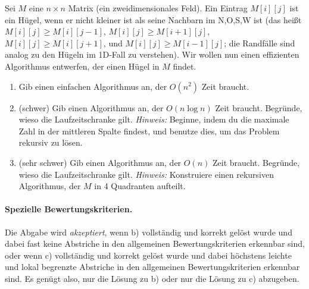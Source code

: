 \documentclass{uebung_cs}
\begin{document}
	Sei $M$ eine $n\times n$ Matrix (ein zweidimensionales Feld).
	Ein Eintrag $M[i][j]$ ist ein Hügel, wenn er nicht kleiner ist als seine Nachbarn im N,O,S,W ist (das heißt $M[i][j]\ge M[i][j-1]$, $M[i][j]\ge M[i+1][j]$, $M[i][j]\ge M[i][j+1]$, und $M[i][j]\ge M[i-1][j]$; die Randfälle sind analog zu den Hügeln im 1D-Fall zu verstehen).
	Wir wollen nun einen effizienten Algorithmus entwerfen, der einen Hügel in $M$ findet.
	\begin{enumerate}
		\item Gib einen einfachen Algorithmus an, der $O(n^2)$ Zeit braucht.
		\item (schwer) Gib einen Algorithmus an, der $O(n \log n)$ Zeit braucht. Begründe, wieso die Laufzeitschranke gilt. \emph{Hinweis:} Beginne, indem du die maximale Zahl in der mittleren Spalte findest, und benutze dies, um das Problem rekursiv zu lösen.
		\item (sehr schwer) Gib einen Algorithmus an, der $O(n)$ Zeit braucht. Begründe, wieso die Laufzeitschranke gilt. \emph{Hinweis:} Konstruiere einen rekursiven Algorithmus, der $M$ in 4 Quadranten aufteilt.
	\end{enumerate}

\paragraph{Spezielle Bewertungskriterien.}
Die Abgabe wird \emph{akzeptiert}, wenn b) vollständig und korrekt gelöst wurde und dabei fast keine Abstriche in den allgemeinen Bewertungskriterien erkennbar sind, oder wenn c) vollständig und korrekt gelöst wurde und dabei höchstens leichte und lokal begrenzte Abstriche in den allgemeinen Bewertungskriterien erkennbar sind.
Es genügt also, nur die Lösung zu b) oder nur die Lösung zu c) abzugeben.


\end{document}
